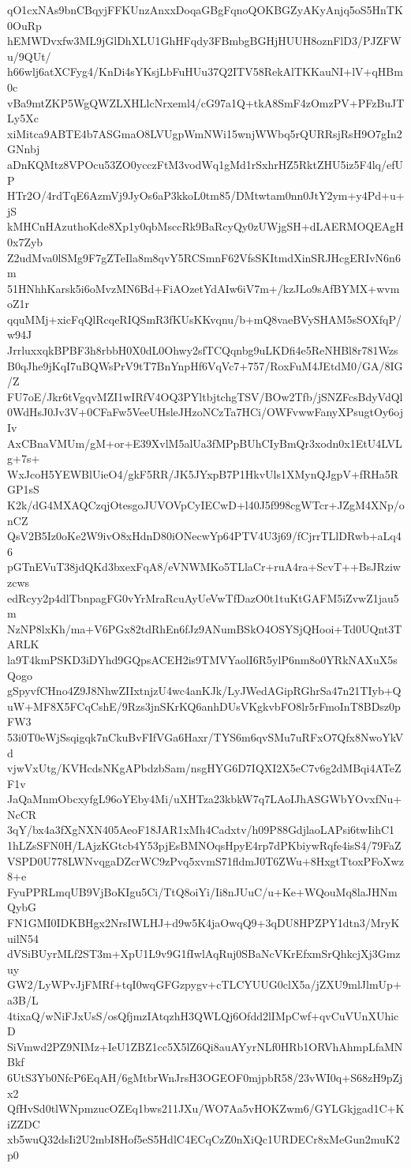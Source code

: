 qO1cxNAs9bnCBqyjFFKUnzAnxxDoqaGBgFqnoQOKBGZyAKyAnjq5oS5HnTK0OuRp
hEMWDvxfw3ML9jGlDhXLU1GhHFqdy3FBmbgBGHjHUUH8oznFlD3/PJZFWu/9QUt/
h66wlj6atXCFyg4/KnDi4sYKsjLbFuHUu37Q2ITV58RekAlTKKauNI+lV+qHBm0c
vBa9mtZKP5WgQWZLXHLlcNrxeml4/cG97a1Q+tkA8SmF4zOmzPV+PFzBuJTLy5Xc
xiMitca9ABTE4b7ASGmaO8LVUgpWmNWi15wnjWWbq5rQURRsjRsH9O7gIn2GNnbj
aDnKQMtz8VPOcu53ZO0ycczFtM3vodWq1gMd1rSxhrHZ5RktZHU5iz5F4lq/efUP
HTr2O/4rdTqE6AzmVj9JyOs6aP3kkoL0tm85/DMtwtam0nn0JtY2ym+y4Pd+u+jS
kMHCnHAzuthoKde8Xp1y0qbMsccRk9BaRcyQy0zUWjgSH+dLAERMOQEAgH0x7Zyb
Z2udMva0lSMg9F7gZTeIla8m8qvY5RCSmnF62VfsSKItmdXinSRJHcgERIvN6n6m
51HNhhKarsk5i6oMvzMN6Bd+FiAOzetYdAIw6iV7m+/kzJLo9sAfBYMX+wvmoZ1r
qquMMj+xicFqQlRcqeRIQSmR3fKUsKKvqnu/b+mQ8vaeBVySHAM5sSOXfqP/w94J
JrrluxxqkBPBF3h8rbbH0X0dL0Ohwy2sfTCQqnbg9uLKDfi4e5ReNHBl8r781Wzs
B0qJhe9jKqI7uBQWsPrV9tT7BnYnpHf6VqVc7+757/RoxFuM4JEtdM0/GA/8IG/Z
FU7oE/Jkr6tVgqvMZI1wIRfV4OQ3PYltbjtchgTSV/BOw2Tfb/jSNZFcsBdyVdQl
0WdHsJ0Jv3V+0CFaFw5VeeUHsleJHzoNCzTa7HCi/OWFvwwFanyXPsugtOy6ojIv
AxCBnaVMUm/gM+or+E39XvlM5alUa3fMPpBUhCIyBmQr3xodn0x1EtU4LVLg+7s+
WxJcoH5YEWBlUieO4/gkF5RR/JK5JYxpB7P1HkvUls1XMynQJgpV+fRHa5RGP1sS
K2k/dG4MXAQCzqjOtesgoJUVOVpCyIECwD+l40J5f998cgWTcr+JZgM4XNp/onCZ
QsV2B5Iz0oKe2W9ivO8xHdnD80iONecwYp64PTV4U3j69/fCjrrTLlDRwb+aLq46
pGTnEVuT38jdQKd3bxexFqA8/eVNWMKo5TLlaCr+ruA4ra+ScvT++BsJRziwzcws
edRcyy2p4dlTbnpagFG0vYrMraRcuAyUeVwTfDazO0t1tuKtGAFM5iZvwZ1jau5m
NzNP8lxKh/ma+V6PGx82tdRhEn6fJz9ANumBSkO4OSYSjQHooi+Td0UQnt3TARLK
la9T4kmPSKD3iDYhd9GQpsACEH2is9TMVYaolI6R5ylP6nm8o0YRkNAXuX5sQogo
gSpyvfCHno4Z9J8NhwZIIxtnjzU4wc4anKJk/LyJWedAGipRGhrSa47n21TIyb+Q
uW+MF8X5FCqCshE/9Rzs3jnSKrKQ6anhDUsVKgkvbFO8lr5rFmoInT8BDsz0pFW3
53i0T0eWjSsqigqk7nCkuBvFIfVGa6Haxr/TYS6m6qvSMu7uRFxO7Qfx8NwoYkVd
vjwVxUtg/KVHcdsNKgAPbdzbSam/nsgHYG6D7IQXI2X5eC7v6g2dMBqi4ATeZF1v
JaQaMnmObcxyfgL96oYEby4Mi/uXHTza23kbkW7q7LAoIJhASGWbYOvxfNu+NcCR
3qY/bx4a3fXgNXN405AeoF18JAR1xMh4Cadxtv/h09P88GdjlaoLAPsi6twIihC1
1hLZsSFN0H/LAjzKGtcb4Y53pjEsBMNOqsHpyE4rp7dPKbiywRqfe4isS4/79FaZ
VSPD0U778LWNvqgaDZcrWC9zPvq5xvmS71fldmJ0T6ZWu+8HxgtTtoxPFoXwz8+e
FyuPPRLmqUB9VjBoKIgu5Ci/TtQ8oiYi/Ii8nJUuC/u+Ke+WQouMq8laJHNmQybG
FN1GMI0IDKBHgx2NrsIWLHJ+d9w5K4jaOwqQ9+3qDU8HPZPY1dtn3/MryKuilN54
dVSiBUyrMLf2ST3m+XpU1L9v9G1fIwlAqRuj0SBaNcVKrEfxmSrQhkcjXj3Gmzuy
GW2/LyWPvJjFMRf+tqI0wqGFGzpygv+cTLCYUUG0clX5a/jZXU9mlJlmUp+a3B/L
4tixaQ/wNiFJxUsS/osQfjmzIAtqzhH3QWLQj6Ofdd2lIMpCwf+qvCuVUnXUhicD
SiVmwd2PZ9NIMz+IeU1ZBZ1cc5X5lZ6Qi8auAYyrNLf0HRb1ORVhAhmpLfaMNBkf
6UtS3Yb0NfcP6EqAH/6gMtbrWnJrsH3OGEOF0mjpbR58/23vWI0q+S68zH9pZjx2
QfHvSd0tlWNpmzucOZEq1bws211JXu/WO7Aa5vHOKZwm6/GYLGkjgad1C+KiZZDC
xb5wuQ32dsIi2U2mbI8Hof5eS5HdlC4ECqCzZ0nXiQc1URDECr8xMeGun2muK2p0
